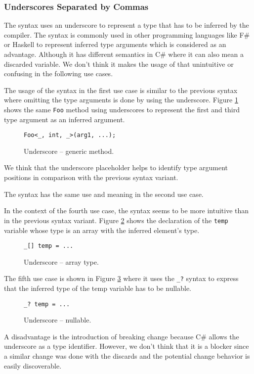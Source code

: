 \subsubsection{Underscores Separated by Commas} 

The syntax uses an underscore to represent a type that has to be inferred by the compiler. 
The syntax is commonly used in other programming languages like F\# or Haskell to represent inferred type arguments which is considered as an advantage. 
Although it has different semantics in C\# where it can also mean a discarded variable.
We don’t think it makes the usage of that unintuitive or confusing in the following use cases.
\par
The usage of the syntax in the first use case is similar to the previous syntax where omitting the type arguments is done by using the underscore.
Figure \ref{img50:opU0} shows the same \texttt{Foo} method using underscores to represent the first and third type argument as an inferred argument.
\begin{figure}[h!]
\begin{lstlisting}[style=csharp]
Foo<_, int, _>(arg1, ...);
\end{lstlisting}
\caption{Underscore -- generic method.}
\label{img50:opU0}
\end{figure}
We think that the underscore placeholder helps to identify type argument positions in comparison with the previous syntax variant.
\par
The syntax has the same use and meaning in the second use case.
\par
In the context of the fourth use case, the syntax seems to be more intuitive than in the previous syntax variant.
Figure \ref{img51:opU4} shows the declaration of the \texttt{temp} variable whose type is an array with the inferred element's type.
\begin{figure}[h!]
\begin{lstlisting}[style=csharp]
_[] temp = ...
\end{lstlisting}
\caption{Underscore -- array type.}
\label{img51:opU4}
\end{figure}
\par
The fifth use case is shown in Figure \ref{img52:opU5} where it uses the \texttt{\_?} syntax to express that the inferred type of the temp variable has to be nullable.
\begin{figure}[h!]
\begin{lstlisting}[style=csharp]
_? temp = ...
\end{lstlisting}
\caption{Underscore -- nullable.}
\label{img52:opU5}
\end{figure}
\par
A disadvantage is the introduction of breaking change because C\# allows the underscore as a type identifier. 
However, we don't think that it is a blocker since a similar change was done with the discards and the potential change behavior is
easily discoverable.

